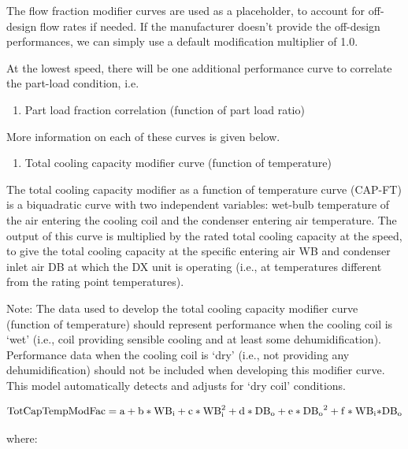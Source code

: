 The flow fraction modifier curves are used as a placeholder, to account for off-design flow rates if needed. If the manufacturer doesn't provide the off-design performances, we can simply use a default modification multiplier of 1.0.

At the lowest speed, there will be one additional performance curve to correlate the part-load condition, i.e.

\begin{enumerate}
\def\labelenumi{\arabic{enumi})}
\setcounter{enumi}{4}
\tightlist
\item
  Part load fraction correlation (function of part load ratio)
\end{enumerate}

More information on each of these curves is given below.

\begin{enumerate}
\def\labelenumi{\arabic{enumi})}
\item Total cooling capacity modifier curve (function of temperature)
\end{enumerate}

The total cooling capacity modifier as a function of temperature curve (CAP-FT) is a biquadratic curve with two independent variables: wet-bulb temperature of the air entering the cooling coil and the condenser entering air temperature. The output of this curve is multiplied by the rated total cooling capacity at the speed, to give the total cooling capacity at the specific entering air WB and condenser inlet air DB at which the DX unit is operating (i.e., at temperatures different from the rating point temperatures).

Note: The data used to develop the total cooling capacity modifier curve (function of temperature) should represent performance when the cooling coil is `wet' (i.e., coil providing sensible cooling and at least some dehumidification). Performance data when the cooling coil is `dry' (i.e., not providing any dehumidification) should not be included when developing this modifier curve. This model automatically detects and adjusts for `dry coil' conditions.

\begin{equation}
{\rm{TotCapTempModFac}} = {\rm{a}} + {\rm{b*W}}{{\rm{B}}_{\rm{i}}} + {\rm{c*WB}}_{\rm{i}}^2 + {\rm{d*D}}{{\rm{B}}_{\rm{o}}} + {\rm{e*D}}{{\rm{B}}_{\rm{o}}}^2 + {\rm{f*W}}{{\rm{B}}_{\rm{i}}}{\rm{*D}}{{\rm{B}}_{\rm{o}}}
\end{equation}

where:

